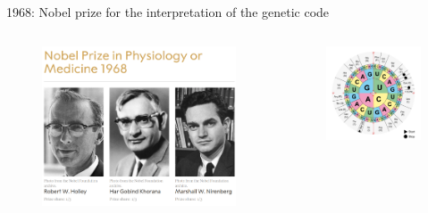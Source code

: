 \documentclass[10pt]{beamer}
\begin{document}
\begin{frame}{1968: Nobel prize for the interpretation of the genetic code}
	\begin{columns}[T,onlytextwidth]
		\begin{figure}
			\includegraphics[width=\textwidth]{./figures/nobel1968.png}
		\end{figure}
		\begin{figure}
			\includegraphics[width=\textwidth]{./figures/codesonne2.png}

\end{figure}
\end{columns}
\end{frame}
\end{document}

